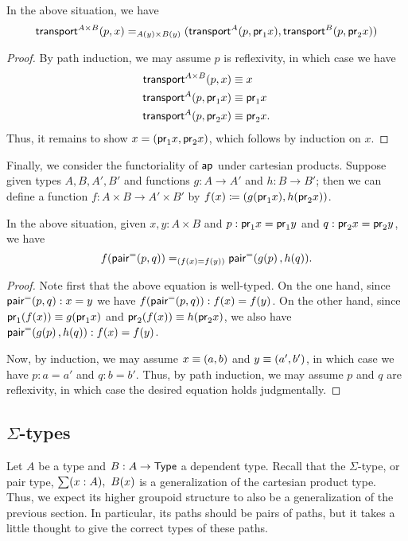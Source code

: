 \begin{thm}\label{thm:trans-prod}
  In the above situation, we have
  \[
  \id[A(y) \times B(y)]
  {\transfib{A\times B}px}
  {(\transfib{A}{p}{\proj{1}x}, \transfib{B}{p}{\proj{2}x})}
  \]
\end{thm}
\begin{proof}
  By path induction, we may assume $p$ is reflexivity, in which case we have
  \begin{align*}
    \transfib{A\times B}px&\jdeq x\\
    \transfib{A}{p}{\proj{1}x}&\jdeq \proj1x\\
    \transfib{A}{p}{\proj{2}x}&\jdeq \proj2x.
  \end{align*}
  Thus, it remains to show $x = (\proj1 x, \proj2x)$, which follows by induction on $x$.
\end{proof}

Finally, we consider the functoriality of $\apfunc{}$ under cartesian products.
Suppose given types $A,B,A',B'$ and functions $g:A\to A'$ and $h:B\to B'$; then we can define a function $f:A\times B\to A'\times B'$ by $f(x) \defeq (g(\proj1x),h(\proj2x))$.

\begin{thm}\label{thm:ap-prod}
  In the above situation, given $x,y:A\times B$ and $p:\proj1x=\proj1y$ and $q:\proj2x=\proj2y$, we have
  \[ \id[(f(x)=f(y))]{\ap{f}{\pairpath(p,q)}} {\pairpath(\ap{g}{p},\ap{h}{q})}. \]
\end{thm}
\begin{proof}
  Note first that the above equation is well-typed.
  On the one hand, since $\pairpath(p,q):x=y$ we have $\ap{f}{\pairpath(p,q)}:f(x)=f(y)$.
  On the other hand, since $\proj1(f(x))\jdeq g(\proj1x)$ and $\proj2(f(x))\jdeq h(\proj2x)$, we also have $\pairpath(\ap{g}{p},\ap{h}{q}):f(x)=f(y)$.

  Now, by induction, we may assume $x\jdeq(a,b)$ and $y\jdeq(a',b')$, in which case we have $p:a=a'$ and $q:b=b'$.
  Thus, by path induction, we may assume $p$ and $q$ are reflexivity, in which case the desired equation holds judgmentally.
\end{proof}


\subsection{$\Sigma$-types}
\label{sec:compute-sigma}

Let $A$ be a type and $B:A\to\type$ a dependent type.
Recall that the $\Sigma$-type, or pair type, $\sm{x:A} B(x)$ is a generalization of the cartesian product type.
Thus, we expect its higher groupoid structure to also be a generalization of the previous section.
In particular, its paths should be pairs of paths, but it takes a little thought to give the correct types of these paths.


